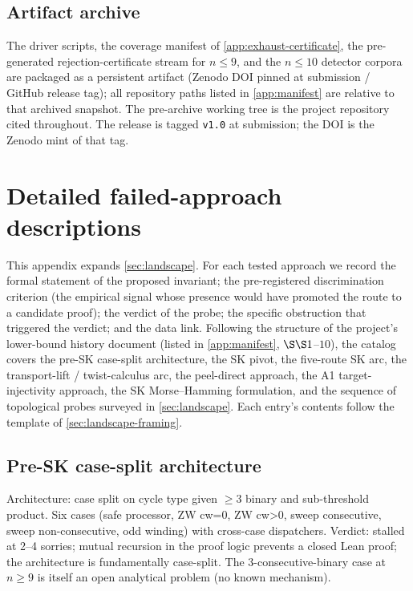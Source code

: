 \documentclass[11pt,a4paper]{article}
\theoremstyle{plain}
\theoremstyle{definition}
\begin{document}
\subsection{Artifact archive}\label{app:exhaust-artifact}

The driver scripts, the coverage manifest of
\cref{app:exhaust-certificate}, the pre-generated
rejection-certificate stream for $n \le 9$, and the
$n \le 10$ detector corpora are packaged as a persistent artifact
(Zenodo DOI pinned at submission / GitHub release tag); all
repository paths listed in \cref{app:manifest} are relative to
that archived snapshot.  The pre-archive working tree is the
project repository cited throughout.  The release is tagged
\texttt{v1.0} at submission; the DOI is the Zenodo mint of that
tag.

\section{Detailed failed-approach descriptions}\label{app:landscape-detail}

This appendix expands \cref{sec:landscape}.  For each tested approach
we record the formal statement of the proposed invariant; the
pre-registered discrimination criterion (the empirical signal whose
presence would have promoted the route to a candidate proof); the
verdict of the probe; the specific obstruction that triggered the
verdict; and the data link.  Following the structure of the
project's lower-bound history document (listed in
\cref{app:manifest}, $\S\S1$--$10$), the catalog covers the pre-SK
case-split architecture, the SK pivot,
the five-route SK arc, the transport-lift / twist-calculus arc, the
peel-direct approach, the A1 target-injectivity approach, the
SK Morse--Hamming formulation, and the sequence of topological
probes surveyed in \cref{sec:landscape}.  Each entry's contents
follow the template of \cref{sec:landscape-framing}.

\subsection{Pre-SK case-split architecture}\label{app:lndsc-presk}

Architecture: case split on cycle type given $\ge 3$ binary and
sub-threshold product.  Six cases (safe processor, ZW cw=0, ZW cw>0,
sweep consecutive, sweep non-consecutive, odd winding) with cross-case
dispatchers.  Verdict: stalled at 2--4 sorries; mutual recursion in
the proof logic prevents a closed Lean proof; the architecture is
fundamentally case-split.  The $3$-consecutive-binary case at $n \ge 9$
is itself an open analytical problem (no known mechanism).
\end{document}
